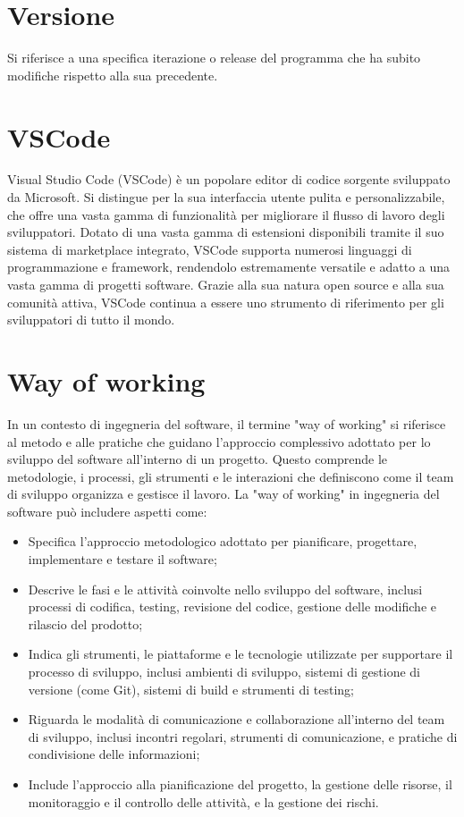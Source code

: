 \documentclass{article}
\begin{document}
\section{Versione}
Si riferisce a una specifica iterazione o release del programma che ha subito modifiche rispetto alla sua precedente.

\section{VSCode}
Visual Studio Code (VSCode) è un popolare editor di codice sorgente sviluppato da Microsoft. Si distingue per la sua interfaccia utente pulita e personalizzabile, che offre una vasta gamma di funzionalità per migliorare il flusso di lavoro degli sviluppatori. Dotato di una vasta gamma di estensioni disponibili tramite il suo sistema di marketplace integrato, VSCode supporta numerosi linguaggi di programmazione e framework, rendendolo estremamente versatile e adatto a una vasta gamma di progetti software. Grazie alla sua natura open source e alla sua comunità attiva, VSCode continua a essere uno strumento di riferimento per gli sviluppatori di tutto il mondo.

\section{Way of working}

In un contesto di ingegneria del software, il termine "way of working" si riferisce al metodo e alle pratiche che guidano l'approccio complessivo adottato per lo sviluppo del software all'interno di un progetto. Questo comprende le metodologie, i processi, gli strumenti e le interazioni che definiscono come il team di sviluppo organizza e gestisce il lavoro. La "way of working" in ingegneria del software può includere aspetti come:
\begin{itemize}
    \item Specifica l'approccio metodologico adottato per pianificare, progettare, implementare e testare il software;
    \item Descrive le fasi e le attività coinvolte nello sviluppo del software, inclusi processi di codifica, testing, revisione del codice, gestione delle modifiche e rilascio del prodotto;
    \item Indica gli strumenti, le piattaforme e le tecnologie utilizzate per supportare il processo di sviluppo, inclusi ambienti di sviluppo, sistemi di gestione di versione (come Git), sistemi di build e strumenti di testing;
    \item Riguarda le modalità di comunicazione e collaborazione all'interno del team di sviluppo, inclusi incontri regolari, strumenti di comunicazione, e pratiche di condivisione delle informazioni;
    \item Include l'approccio alla pianificazione del progetto, la gestione delle risorse, il monitoraggio e il controllo delle attività, e la gestione dei rischi.
\end{itemize}
\end{document}
